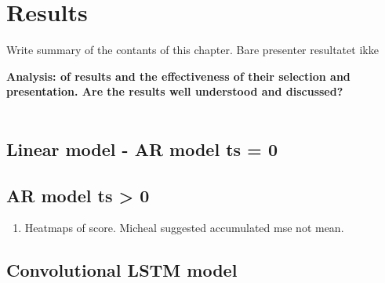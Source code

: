\chapter{Results}
Write summary of the contants of this chapter.
Bare presenter resultatet ikke 



\textbf{Analysis: of results and the effectiveness of their selection and presentation.
Are the results well understood and discussed? }
\\ \\

\section{Linear model - AR model ts = 0} 


\section{AR model ts > 0}
\begin{enumerate}
    \item Heatmaps of score. Micheal suggested accumulated mse not mean.
\end{enumerate}

\section{Convolutional LSTM model}

